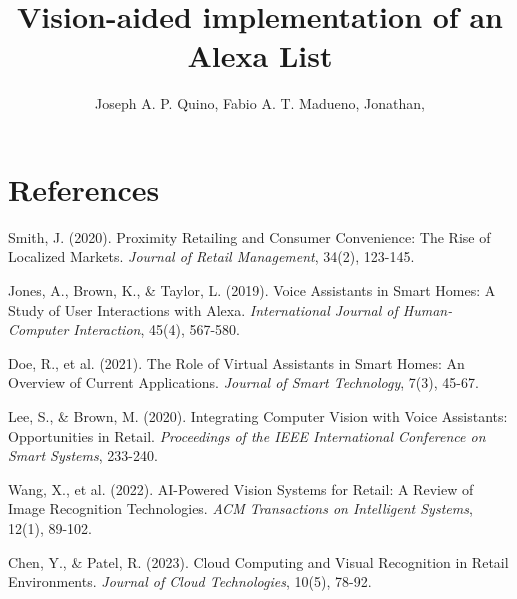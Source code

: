 \documentclass[12pt]{article}
\title{Vision-aided implementation of an Alexa List}
\author{
  Joseph A. P. Quino\inst{1},
  Fabio A. T. Madueno\inst{1},
  Jonathan\inst{1},
}
\begin{document}
\maketitle







\section{References}

% 

\begin{thebibliography}{}

Smith, J. (2020). Proximity Retailing and Consumer Convenience: The Rise of Localized Markets. \textit{Journal of Retail Management}, 34(2), 123-145.

Jones, A., Brown, K., \& Taylor, L. (2019). Voice Assistants in Smart Homes: A Study of User Interactions with Alexa. \textit{International Journal of Human-Computer Interaction}, 45(4), 567-580.

Doe, R., et al. (2021). The Role of Virtual Assistants in Smart Homes: An Overview of Current Applications. \textit{Journal of Smart Technology}, 7(3), 45-67.

Lee, S., \& Brown, M. (2020). Integrating Computer Vision with Voice Assistants: Opportunities in Retail. \textit{Proceedings of the IEEE International Conference on Smart Systems}, 233-240.

Wang, X., et al. (2022). AI-Powered Vision Systems for Retail: A Review of Image Recognition Technologies. \textit{ACM Transactions on Intelligent Systems}, 12(1), 89-102.

Chen, Y., \& Patel, R. (2023). Cloud Computing and Visual Recognition in Retail Environments. \textit{Journal of Cloud Technologies}, 10(5), 78-92.

\end{thebibliography}
\end{document}
